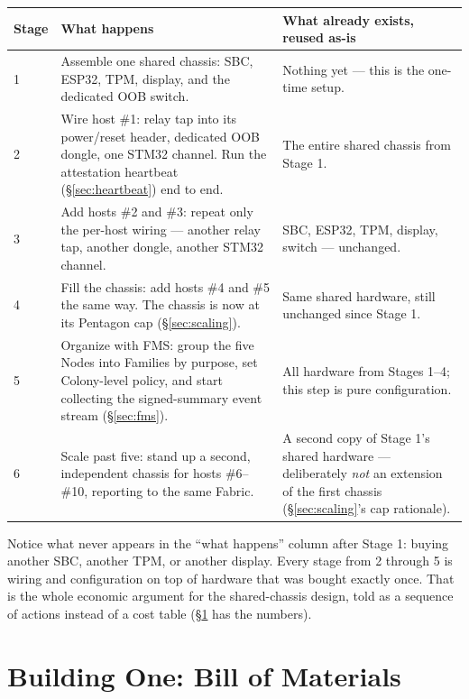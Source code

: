 \documentclass[11pt,a4paper]{article}
\begin{document}
\begin{center}
\renewcommand{\arraystretch}{1.4}
\small
\begin{tabular}{@{}p{1.1cm}p{5.0cm}p{7.3cm}@{}}
\toprule
\textbf{Stage} & \textbf{What happens} & \textbf{What already exists, reused as-is} \\
\midrule
1 & Assemble one shared chassis: SBC, ESP32, TPM, display, and the
dedicated OOB switch. & Nothing yet --- this is the one-time setup. \\
2 & Wire host \#1: relay tap into its power/reset header, dedicated
OOB dongle, one STM32 channel. Run the attestation heartbeat
(\S\ref{sec:heartbeat}) end to end. & The entire shared chassis from
Stage 1. \\
3 & Add hosts \#2 and \#3: repeat only the per-host wiring --- another
relay tap, another dongle, another STM32 channel. & SBC, ESP32, TPM,
display, switch --- unchanged. \\
4 & Fill the chassis: add hosts \#4 and \#5 the same way. The chassis
is now at its Pentagon cap (\S\ref{sec:scaling}). & Same shared
hardware, still unchanged since Stage 1. \\
5 & Organize with FMS: group the five Nodes into Families by purpose,
set Colony-level policy, and start collecting the signed-summary
event stream (\S\ref{sec:fms}). & All hardware from Stages 1--4; this
step is pure configuration. \\
6 & Scale past five: stand up a second, independent chassis for hosts
\#6--\#10, reporting to the same Fabric. & A second copy of Stage 1's
shared hardware --- deliberately \emph{not} an extension of the
first chassis (\S\ref{sec:scaling}'s cap rationale). \\
\bottomrule
\end{tabular}
\end{center}

\begin{plainbox}
Notice what never appears in the ``what happens'' column after Stage 1:
buying another SBC, another TPM, or another display. Every stage from 2
through 5 is wiring and configuration on top of hardware that was
bought exactly once. That is the whole economic argument for the
shared-chassis design, told as a sequence of actions instead of a cost
table (\S\ref{sec:bom} has the numbers).
\end{plainbox}

\section{Building One: Bill of Materials}
\label{sec:bom}
\end{document}
